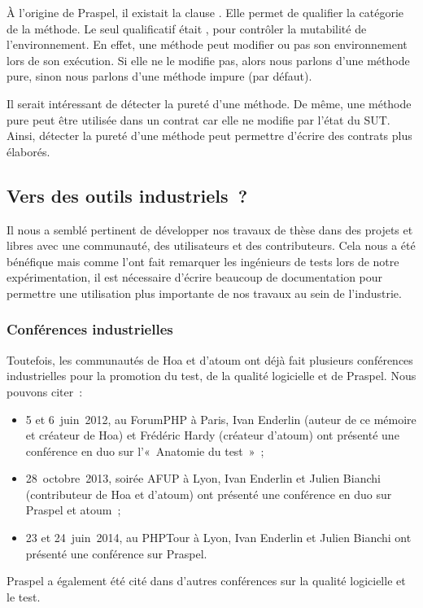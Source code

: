 À l'origine de Praspel, il existait la clause \ais. Elle permet de qualifier la
catégorie de la méthode. Le seul qualificatif était , pour
contrôler la mutabilité de l'environnement. En effet, une méthode peut modifier
ou pas son environnement lors de son exécution. Si elle ne le modifie pas, alors
nous parlons d'une méthode {\strong pure}, sinon nous parlons d'une méthode
{\strong impure} (par défaut).

Il serait intéressant de détecter la pureté d'une méthode. De même, une méthode
pure peut être utilisée dans un contrat car elle ne modifie par l'état du SUT.
Ainsi, détecter la pureté d'une méthode peut permettre d'écrire des contrats
plus élaborés.

\subsection{Vers des outils industriels~?}

Il nous a semblé pertinent de développer nos travaux de thèse dans des projets
 et libres avec une communauté, des utilisateurs et des
contributeurs. Cela nous a été bénéfique mais comme l'ont fait remarquer les
ingénieurs de tests lors de notre expérimentation, il est nécessaire d'écrire
beaucoup de documentation pour permettre une utilisation plus importante de nos
travaux au sein de l'industrie.

\subsubsection{Conférences industrielles}

Toutefois, les communautés de Hoa et d'atoum ont déjà fait plusieurs conférences
industrielles pour la promotion du test, de la qualité logicielle et de Praspel.
Nous pouvons citer~:
%
\begin{itemize}

\item 5 et 6~juin~2012, au ForumPHP à Paris, Ivan Enderlin (auteur de ce mémoire
et créateur de Hoa) et Frédéric Hardy (créateur d'atoum) ont présenté une
conférence en duo sur l'«~Anatomie du test~»~;

\item 28~octobre~2013, soirée AFUP à Lyon, Ivan Enderlin et Julien Bianchi
(contributeur de Hoa et d'atoum) ont présenté une conférence en duo sur Praspel
et atoum~;

\item 23 et 24~juin~2014, au PHPTour à Lyon, Ivan Enderlin et Julien Bianchi ont
présenté une conférence sur Praspel.

\end{itemize}
%
Praspel a également été cité dans d'autres conférences sur la qualité logicielle
et le test.

